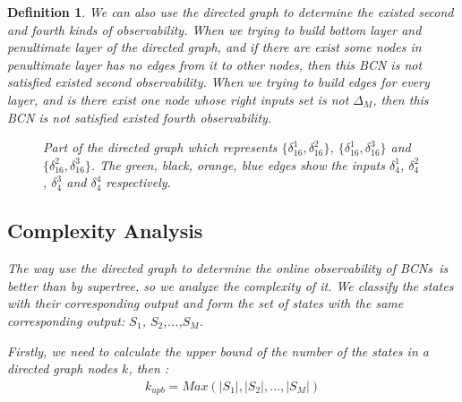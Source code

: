 \documentclass[conference]{IEEEtran} %
\newtheorem{definition}{Definition}
\def \BCNs {{\em BCNs}}
\begin{document}
\begin{definition}
We can also use the directed graph to determine the existed second and fourth kinds of observability. When we trying to build bottom layer and penultimate layer of the directed graph, and if there are exist some nodes in penultimate layer has no edges from it to other nodes, then this BCN is not satisfied existed second observability. When we trying to build edges for every layer, and is there exist one node whose right inputs set is not $\Delta_M$, then this BCN is not satisfied existed fourth observability.
\begin{figure}[thpb]
      \centering
      
      \caption{Part of the directed graph which represents $\{\delta_{16}^1,\delta_{16}^2\}$, $\{\delta_{16}^1,\delta_{16}^3\}$ and $\{\delta_{16}^2,\delta_{16}^3\}$. The green, black, orange, blue edges show the inputs $\delta_4^1$, $\delta_4^2$, $\delta_4^3$ and $\delta_4^4$ respectively.}
      \label{fig:4}
   \end{figure}
\subsection{Complexity Analysis}
The way use the directed graph to determine the online observability of \BCNs\ is better than by supertree, so we analyze the complexity of it. We classify the states with their corresponding output and form the set of states with the same corresponding output: $S_1$, $S_2$,...,$S_M$.

Firstly, we need to calculate the upper bound of the number of the states in a directed graph nodes $k$, then :
\begin{equation}
\begin{split}
k_{upb}= Max(|S_1|,|S_2|,...,|S_M|)
\end{split}
\end{equation}


\end{definition}
\end{document}
